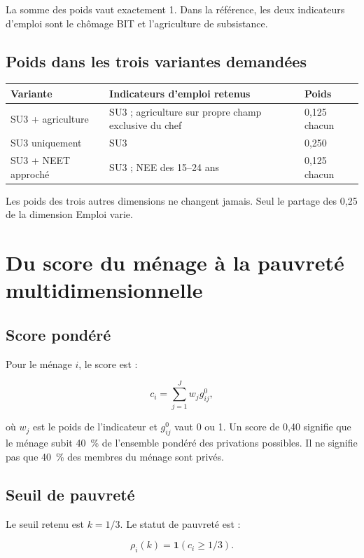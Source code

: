 \documentclass[11pt,a4paper]{article}
\begin{document}
La somme des poids vaut exactement 1. Dans la référence, les deux indicateurs d'emploi sont le
chômage BIT et l'agriculture de subsistance.

\subsection{Poids dans les trois variantes demandées}

\begin{center}
\small
\begin{tabular}{@{}p{4.3cm}p{7cm}p{2.1cm}@{}}
\toprule
\textbf{Variante} & \textbf{Indicateurs d'emploi retenus} & \textbf{Poids} \\
\midrule
SU3 + agriculture & SU3 ; agriculture sur propre champ exclusive du chef & 0,125 chacun \\
SU3 uniquement & SU3 & 0,250 \\
SU3 + NEET approché & SU3 ; NEE des 15--24 ans & 0,125 chacun \\
\bottomrule
\end{tabular}
\end{center}

Les poids des trois autres dimensions ne changent jamais. Seul le partage des 0,25 de la
dimension Emploi varie.

\section{Du score du ménage à la pauvreté multidimensionnelle}

\subsection{Score pondéré}

Pour le ménage $i$, le score est :

\[
  c_i = \sum_{j=1}^{J} w_j g^0_{ij},
\]

où $w_j$ est le poids de l'indicateur et $g^0_{ij}$ vaut 0 ou 1. Un score de 0,40 signifie que le
ménage subit 40~\% de l'ensemble pondéré des privations possibles. Il ne signifie pas que 40~\%
des membres du ménage sont privés.

\subsection{Seuil de pauvreté}

Le seuil retenu est $k=1/3$. Le statut de pauvreté est :

\[
  \rho_i(k) = \mathbf{1}(c_i \geq 1/3).
\]
\end{document}
